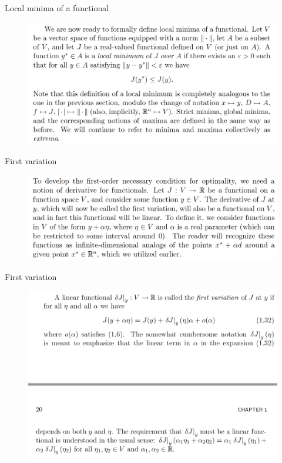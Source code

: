 \documentclass{beamer}
\begin{document}
\begin{frame}{Local minima of a functional}
    \begin{figure}
        \centering
        \includegraphics[width=\linewidth]{ch1/fig2.png}
    \end{figure}
\end{frame}

\begin{frame}{First variation}
     \begin{figure}
        \centering
        \includegraphics[width=\linewidth]{ch1/fig3.png}
    \end{figure}
\end{frame}

\begin{frame}{First variation}
    \begin{figure}
        \centering
        \includegraphics[width=\linewidth]{ch1/fig4.png}
    \end{figure}
\end{frame}
\end{document}
